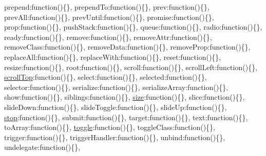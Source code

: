 \begin{DoxyCompactItemize}
\textquotesingle{}prepend\textquotesingle{}\+:function()\{\}, \textquotesingle{}prepend\+To\textquotesingle{}\+:function()\{\}, \textquotesingle{}prev\textquotesingle{}\+:function()\{\}, \textquotesingle{}prev\+All\textquotesingle{}\+:function()\{\}, \textquotesingle{}prev\+Until\textquotesingle{}\+:function()\{\}, \textquotesingle{}promise\textquotesingle{}\+:function()\{\}, \textquotesingle{}prop\textquotesingle{}\+:function()\{\}, \textquotesingle{}push\+Stack\textquotesingle{}\+:function()\{\}, \textquotesingle{}queue\textquotesingle{}\+:function()\{\}, \textquotesingle{}radio\textquotesingle{}\+:function()\{\}, \textquotesingle{}ready\textquotesingle{}\+:function()\{\}, \textquotesingle{}remove\textquotesingle{}\+:function()\{\}, \textquotesingle{}remove\+Attr\textquotesingle{}\+:function()\{\}, \textquotesingle{}remove\+Class\textquotesingle{}\+:function()\{\}, \textquotesingle{}remove\+Data\textquotesingle{}\+:function()\{\}, \textquotesingle{}remove\+Prop\textquotesingle{}\+:function()\{\}, \textquotesingle{}replace\+All\textquotesingle{}\+:function()\{\}, \textquotesingle{}replace\+With\textquotesingle{}\+:function()\{\}, \textquotesingle{}reset\textquotesingle{}\+:function()\{\}, \textquotesingle{}resize\textquotesingle{}\+:function()\{\}, \textquotesingle{}root\textquotesingle{}\+:function()\{\}, \textquotesingle{}scroll\textquotesingle{}\+:function()\{\}, \textquotesingle{}scroll\+Left\textquotesingle{}\+:function()\{\}, \textquotesingle{}\hyperlink{_scripts_2jquery-1_810_82_8js_a57beb1f611d6c8b84919b0f7d9e0e890}{scroll\+Top}\textquotesingle{}\+:function()\{\}, \textquotesingle{}select\textquotesingle{}\+:function()\{\}, \textquotesingle{}selected\textquotesingle{}\+:function()\{\}, \textquotesingle{}selector\textquotesingle{}\+:function()\{\}, \textquotesingle{}serialize\textquotesingle{}\+:function()\{\}, \textquotesingle{}serialize\+Array\textquotesingle{}\+:function()\{\}, \textquotesingle{}show\textquotesingle{}\+:function()\{\}, \textquotesingle{}siblings\textquotesingle{}\+:function()\{\}, \textquotesingle{}\hyperlink{_scripts_2jquery-1_810_82_8js_afa6806c6ee5e63d5177f1dcc082ba6bc}{size}\textquotesingle{}\+:function()\{\}, \textquotesingle{}slice\textquotesingle{}\+:function()\{\}, \textquotesingle{}slide\+Down\textquotesingle{}\+:function()\{\}, \textquotesingle{}slide\+Toggle\textquotesingle{}\+:function()\{\}, \textquotesingle{}slide\+Up\textquotesingle{}\+:function()\{\}, \textquotesingle{}\hyperlink{_scripts_2jquery-1_810_82_8js_ac9a544302040b74e845b33c285cd10e7}{stop}\textquotesingle{}\+:function()\{\}, \textquotesingle{}submit\textquotesingle{}\+:function()\{\}, \textquotesingle{}target\textquotesingle{}\+:function()\{\}, \textquotesingle{}text\textquotesingle{}\+:function()\{\}, \textquotesingle{}to\+Array\textquotesingle{}\+:function()\{\}, \textquotesingle{}\hyperlink{_scripts_2bootstrap_8min_8js_acf7cf7d86a171d1c082d8bf08f2de490}{toggle}\textquotesingle{}\+:function()\{\}, \textquotesingle{}toggle\+Class\textquotesingle{}\+:function()\{\}, \textquotesingle{}trigger\textquotesingle{}\+:function()\{\}, \textquotesingle{}trigger\+Handler\textquotesingle{}\+:function()\{\}, \textquotesingle{}unbind\textquotesingle{}\+:function()\{\}, \textquotesingle{}undelegate\textquotesingle{}\+:function()\{\}, 
\end{DoxyCompactItemize}
